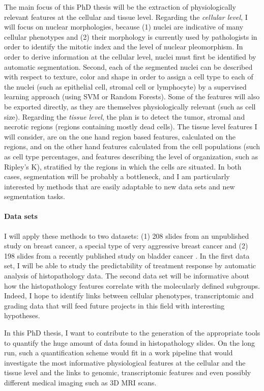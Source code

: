 \documentclass[a4paper,10pt,twocolumn]{article}
\begin{document}
The main focus of this PhD thesis will be the extraction of
physiologically relevant features at the cellular and tissue
level. Regarding the {\em cellular level}, I will focus on nuclear morphologies,
because (1) nuclei are indicative of many cellular
phenotypes\citep{Chow2012} and (2) their morphology is currently used by
pathologists in order to identify the mitotic index and the level of
nuclear pleomorphism\citep{Elston1991}. In order to derive information
at the cellular level, nuclei must first be identified by automatic
segmentation. Second, each of the segmented nuclei can be described
with respect to texture, color and shape in order to assign a cell
type to each of the nuclei (such as epithelial cell, stromal cell or
lymphocyte) by a supervised learning approach (using SVM or Random
Forests). Some of the features will also be exported directly, as they
are themselves physiologically relevant (such as cell size). 
Regarding the {\em tissue level}, the plan is to detect the tumor,
stromal and necrotic regions (regions containing mostly dead
cells). The tissue level features I will consider, are on the one hand
region based features, calculated on the regions, and on the other
hand features calculated from the cell populations (such as cell type
percentages, and features describing the level of organization, such
as Ripley's K), stratified by the regions in which the cells are situated. 
In both cases, segmentation will be probably a bottleneck, and I am
particularly interested by methods that are easily adaptable to new
data sets and new segmentation tasks.

\paragraph{Data sets}

I will apply these methods to
two datasets: (1) 208 slides from an unpublished study on breast
cancer, a special type of very aggressive breast cancer  and (2) 198
slides from a recently published study on bladder cancer
\citep{biton2014independent}. In the first data set, I will be able to
study the predictability of treatment response by automatic
analysis of histopathology data. The second data set will be
informative about how the histopathology features correlate with the
molecularly defined subgroups. Indeed, I hope to identify links between
cellular phenotypes, transcriptomic and grading data that will feed
future projects in this field with interesting hypotheses. 

In this PhD thesis, I want to contribute to the generation of the
appropriate tools to quantify the huge amount of data found in
histopathology slides. On the long run, such a
 quantification scheme would fit in a work pipeline that would
 investigate the most informative physiological features at the
 cellular and the tissue level and the links
 to genomic, transcriptomic features and even possibly different
 medical imaging such as 3D MRI scans. 
\end{document}
